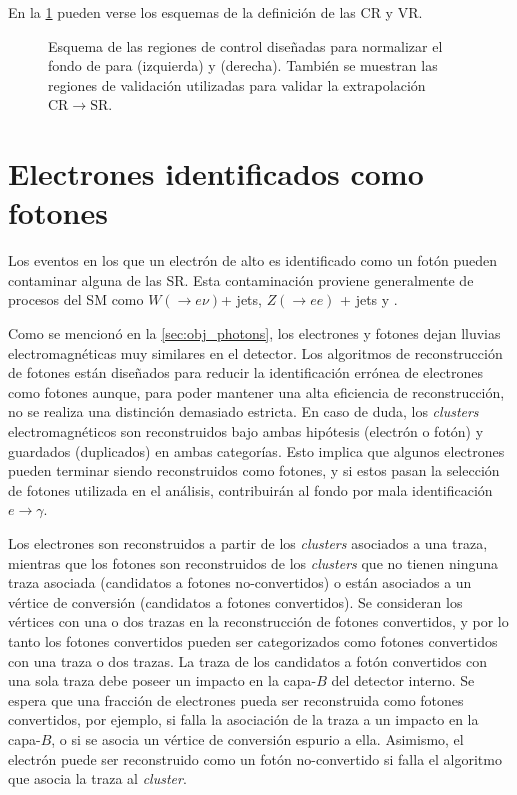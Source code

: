 En la \cref{fig:bkg_crq} pueden verse los esquemas de la definición de las CR y VR.

\begin{figure}[!htbp]
  \centering

  \resizebox{0.49\textwidth}{!}{}
  \resizebox{0.49\textwidth}{!}{}

  \caption{Esquema de las regiones de control diseñadas para normalizar el fondo
    de {\gjet} para {\SRL} (izquierda) y {\SRH} (derecha). También se muestran
    las regiones de validación utilizadas para validar la extrapolación
    $\mathrm{CR}\to\mathrm{SR}$.}
  \label{fig:bkg_crq}
\end{figure}



\section{Electrones identificados como fotones} \label{sec:efakes}

Los eventos en los que un electrón de alto {\pt} es identificado como un
fotón \cite{Bocci:1643300} pueden contaminar alguna de las SR. Esta contaminación
proviene generalmente de procesos del SM como $W(\to e\nu)$+ jets, $Z(\to ee)$ +
jets y {\ttbar}.

Como se mencionó en la \cref{sec:obj_photons}, los electrones y fotones dejan
lluvias electromagnéticas muy similares en el detector. Los algoritmos de
reconstrucción de fotones están diseñados para reducir la identificación errónea
de electrones como fotones aunque, para poder mantener una alta eficiencia de
reconstrucción, no se realiza una distinción demasiado estricta. En caso de
duda, los \emph{clusters} electromagnéticos son reconstruidos bajo ambas hipótesis
(electrón o fotón) y guardados (duplicados) en ambas categorías. Esto implica
que algunos electrones pueden terminar siendo reconstruidos como fotones, y si
estos pasan la selección de fotones utilizada en el análisis, contribuirán al
fondo por mala identificación $e\to\gamma$.

Los electrones son reconstruidos a partir de los \emph{clusters} asociados a una traza,
mientras que los fotones son reconstruidos de los \emph{clusters} que no tienen ninguna
traza asociada (candidatos a fotones no-convertidos) o están asociados a un
vértice de conversión (candidatos a fotones convertidos). Se consideran los
vértices con una o dos trazas en la reconstrucción de fotones convertidos, y por
lo tanto los fotones convertidos pueden ser categorizados como fotones
convertidos con una traza o dos trazas. La traza de los candidatos a fotón
convertidos con una sola traza debe poseer un impacto en la capa-$B$ del detector
interno. Se
espera que una fracción de electrones pueda ser reconstruida como fotones
convertidos, por ejemplo, si falla la asociación de la traza a un impacto en la
capa-$B$, o si se asocia un vértice de conversión espurio a ella. Asimismo, el
electrón puede ser reconstruido como un fotón no-convertido si falla el
algoritmo que asocia la traza al \emph{cluster}.

